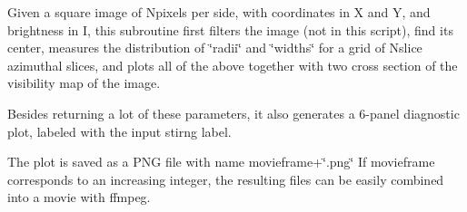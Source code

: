 Given a square image of Npixels per side, with coordinates in X and Y, and brightness in I, this subroutine first filters the image (not in this script), find its center, measures the distribution of \char`\"{}radii\char`\"{} and \char`\"{}widths\char`\"{} for a grid of Nslice azimuthal slices, and plots all of the above together with two cross section of the visibility map of the image.

Besides returning a lot of these parameters, it also generates a 6-\/panel diagnostic plot, labeled with the input stirng \textquotesingle{}label\textquotesingle{}.

The plot is saved as a P\+NG file with name movieframe+\char`\"{}.\+png\char`\"{} If \textquotesingle{}movieframe\textquotesingle{} corresponds to an increasing integer, the resulting files can be easily combined into a movie with ffmpeg.

